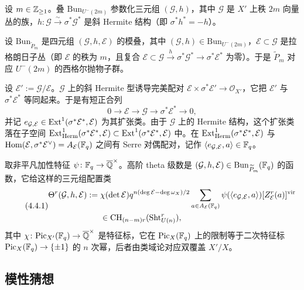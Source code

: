 设 $m\in\mathbb{Z}_{\ge1}$。叠 $\mathrm{Bun}_{U^-(2m)}$ 参数化三元组 $(\mathcal G,h)$，其中 $\mathcal G$ 是 $X'$ 上秩 $2m$ 向量丛的族，$h\colon\mathcal G\xrightarrow{\sim}\sigma^*\mathcal G^*$ 是斜 Hermite 结构（即 $\sigma^*h^*=-h$）。

设 $\mathrm{Bun}_{\widetilde P_m}$ 是四元组 $(\mathcal G,h,\mathcal E)$ 的模叠，其中 $(\mathcal G,h)\in\mathrm{Bun}_{U^-(2m)}$，$\mathcal E\subset\mathcal G$ 是拉格朗日子丛（即 $\mathcal E$ 的秩为 $m$，且复合 $\mathcal E\subset\mathcal G\xrightarrow{h}\sigma^*\mathcal G^*\to\sigma^*\mathcal E^*$ 为零）。于是 $\widetilde P_m$ 对应 $U^-(2m)$ 的西格尔抛物子群。

设 $\mathcal E':=\mathcal G/\mathcal E$。$\mathcal G$ 上的斜 Hermite 型诱导完美配对 $\mathcal E\times\sigma^*\mathcal E'\to\mathcal O_{X'}$，它把 $\mathcal E'$ 与 $\sigma^*\mathcal E^*$ 等同起来。于是有短正合列
\[
0\to\mathcal E\to\mathcal G\to\sigma^*\mathcal E^*\to 0,
\]
并记 $e_{\mathcal G,\mathcal E}\in\operatorname{Ext}^1(\sigma^*\mathcal E^*,\mathcal E)$ 为其扩张类。由于 $\mathcal G$ 上的 Hermite 结构，这个扩张类落在子空间 $\operatorname{Ext}^1_{\mathrm{Herm}}(\sigma^*\mathcal E^*,\mathcal E)\subset\operatorname{Ext}^1(\sigma^*\mathcal E^*,\mathcal E)$ 中。在 $\operatorname{Ext}^1_{\mathrm{Herm}}(\sigma^*\mathcal E^*,\mathcal E)$ 与 $\operatorname{Hom}(\mathcal E,\sigma^*\mathcal E^\vee)=A_{\mathcal E}(\mathbb{F}_q)$ 之间有 Serre 对偶配对，记作 $\langle e_{\mathcal G,\mathcal E},a\rangle\in\mathbb{F}_q$。

取非平凡加性特征 $\psi\colon\mathbb{F}_q\to\overline{\mathbb{Q}}^\times$。高阶 theta 级数是 $(\mathcal G,h,\mathcal E)\in\mathrm{Bun}_{\widetilde P_m}(\mathbb{F}_q)$ 的函数，它给这样的三元组配置类
\begin{equation}\tag{4.4.1}\label{eq:a6-03-2}
\begin{aligned}
\Theta^r(\mathcal G,h,\mathcal E):={}&\chi(\det\mathcal E)q^{n(\deg\mathcal E-\deg\omega_X)/2}\sum_{a\in A_{\mathcal E}(\mathbb{F}_q)}\psi(\langle e_{\mathcal G,\mathcal E},a\rangle)[Z^r_{\mathcal E}(a)]^{\mathrm{vir}}\\
&\in\mathrm{CH}_{(n-m)r}(\mathrm{Sht}^r_{U(n)}),
\end{aligned}
\end{equation}
其中 $\chi\colon\mathrm{Pic}_{X'}(\mathbb{F}_q)\to\overline{\mathbb{Q}}^\times$ 是特征标，它在 $\mathrm{Pic}_X(\mathbb{F}_q)$ 上的限制等于二次特征标 $\mathrm{Pic}_X(\mathbb{F}_q)\to\{\pm1\}$ 的 $n$ 次幂，后者由类域论对应双覆盖 $X'/X$。

\subsection{模性猜想}

